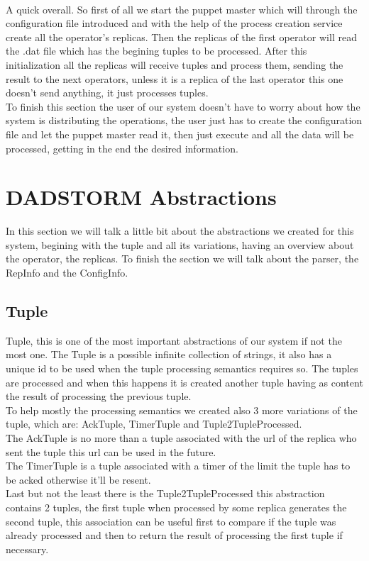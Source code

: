 \documentclass[times, 10pt, twocolumn]{article}
\begin{document}
\\A quick overall. So first of all we start the puppet master which will through the configuration file introduced and with the help of the process creation service create all the operator's replicas. Then the replicas of the first operator will read the .dat file which has the begining tuples to be processed. After this initialization all the replicas will receive tuples and process them, sending the result to the next operators, unless it is a replica of the last operator this one doesn't send anything, it just processes tuples.
\\To finish this section the user of our system doesn't have to worry about how the system is distributing the operations, the user just has to create the configuration file and let the puppet master read it, then just execute and all the data will be processed, getting in the end the desired information.



\section{DADSTORM Abstractions}
In this section we will talk a little bit about the abstractions we created for this system, begining with the tuple and all its variations, having an overview about the operator, the replicas. To finish the section we will talk about the parser, the RepInfo and the ConfigInfo.



\subsection{Tuple}
Tuple, this is one of the most important abstractions of our system if not the most one. The Tuple is a possible infinite collection of strings, it also has a unique id to be used when the tuple processing semantics requires so. The tuples are processed and when this happens it is created another tuple having as content the result of processing the previous tuple. 
\\To help mostly the processing semantics we created also 3 more variations of the tuple, which are: AckTuple, TimerTuple and Tuple2TupleProcessed. 
\\The AckTuple is no more than a tuple associated with the url of the replica who sent the tuple this url can be used in the future. 
\\The TimerTuple is a tuple associated with a timer of the limit the tuple has to be acked otherwise it'll be resent. 
\\Last but not the least there is the Tuple2TupleProcessed this abstraction contains 2 tuples, the first tuple when processed by some replica generates the second tuple, this association can be useful first to compare if the tuple was already processed and then to return the result of processing the first tuple if necessary.
\end{document}
